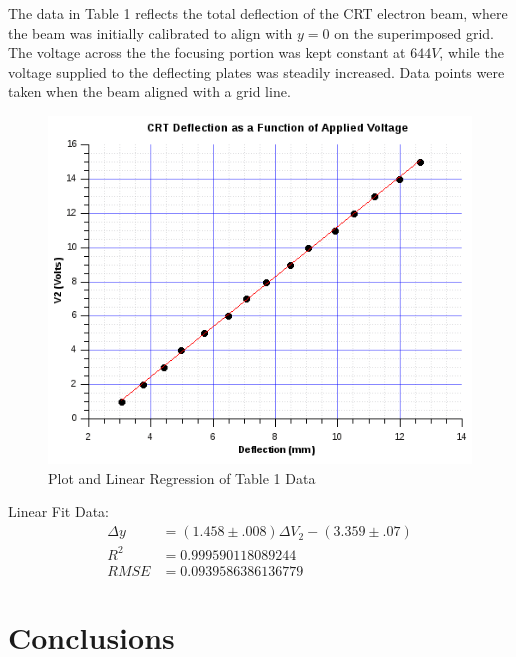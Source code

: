 \documentclass[twocolumn,english,amsmath,amssymb]{IEEEtran}
\theoremstyle{plain}
\theoremstyle{plain}
\begin{document}
The data in Table 1 reflects the total deflection of the CRT electron beam, where the beam was initially calibrated to align with $y=0$ on the superimposed grid. The voltage across the the focusing portion was kept constant at $644 V$, while the voltage supplied to the deflecting plates was steadily increased. Data points were taken when the beam aligned with a grid line.


\begin{figure}[htbp]
\begin{centering}
\begin{center}
 \includegraphics[keepaspectratio=true, width=\linewidth]{./CRTLab.png}
\caption{Plot and Linear Regression of Table 1 Data}
\end{center}
\par\end{centering}
\end{figure}

Linear Fit Data:
\begin{align*}
\Delta y & =(1.458 \pm .008)\Delta V_2 - (3.359 \pm .07) \\
R^2 & = 0.999590118089244 \\
RMSE & = 0.0939586386136779
\end{align*}




\section{Conclusions}
\end{document}

